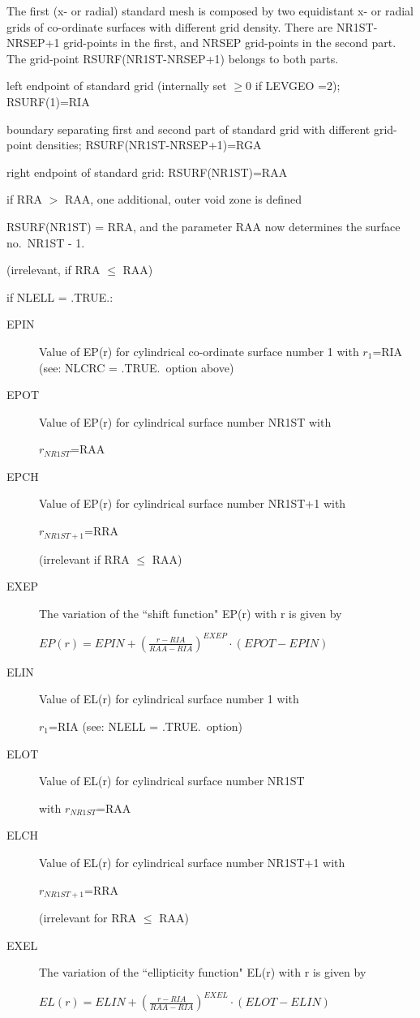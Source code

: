 \begin{description}
        The first (x- or radial) standard mesh is composed by two equidistant x- or
        radial grids of co-ordinate surfaces with different grid density.
        There are NR1ST-NRSEP+1 grid-points in the first, and NRSEP grid-points in the
        second part.
        The grid-point RSURF(NR1ST-NRSEP+1) belongs to both parts.
  \item[RIA] left endpoint of standard grid (internally set $\ge 0$ if LEVGEO
        =2); RSURF(1)=RIA
  \item[RGA] boundary separating first and second part of
        standard grid with different grid-point densities; RSURF(NR1ST-NRSEP+1)=RGA
  \item[RAA] right endpoint of standard grid: RSURF(NR1ST)=RAA
  \item[RRA] if RRA
        $>$ RAA, one additional, outer void zone is defined 

        RSURF(NR1ST) = RRA, and the parameter RAA now determines the surface no.\ NR1ST
        - 1.

        (irrelevant, if RRA $\le$ RAA)
\end{description}

if NLELL = .TRUE.:
\begin{description}
  \item[EPIN] Value of EP(r) for cylindrical co-ordinate surface number 1 with
        $r_1$=RIA (see: NLCRC = .TRUE.\ option above)
  \item[EPOT] Value of EP(r) for
        cylindrical surface number NR1ST with 

        $r_{NR1ST}$=RAA
  \item[EPCH] Value of EP(r) for cylindrical surface number
        NR1ST+1 with 

        $r_{NR1ST+1}$=RRA 

        (irrelevant if RRA $\le$ RAA)
  \item[EXEP] The variation of the ``shift
        function" EP(r) with r is given by 

        $EP(r) = EPIN + {( \frac{r - RIA}{RAA - RIA} )}^{EXEP} \cdot (EPOT - EPIN)$
  \item[ELIN] Value of EL(r) for cylindrical surface number 1 with

        $r_1$=RIA (see: NLELL = .TRUE.\ option)
  \item[ELOT] Value of EL(r) for
        cylindrical surface number NR1ST 

        with $r_{NR1ST}$=RAA
  \item[ELCH] Value of EL(r) for cylindrical surface number
        NR1ST+1 with 

        $r_{NR1ST+1}$=RRA 

        (irrelevant for RRA $\le$ RAA)
  \item[EXEL] The variation of the ``ellipticity
        function" EL(r) with r is given by 

        $EL(r) = ELIN + {( \frac{r - RIA}{RAA - RIA} )}^{EXEL} \cdot (ELOT - ELIN)$
\end{description}

